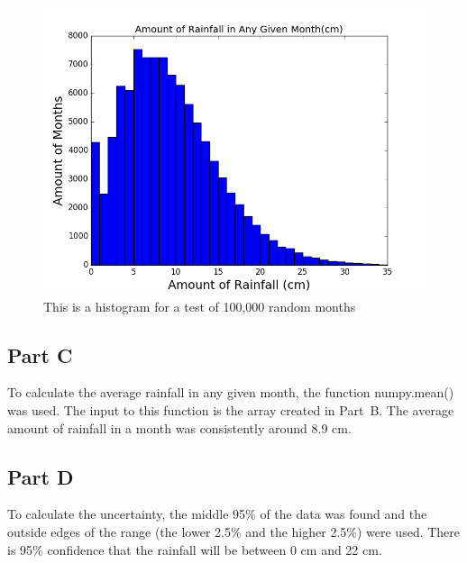 \documentclass[twocolumn]{revtex4}
\begin{document}
	\begin{figure}[h]
	
		\centering
		\includegraphics[width=.9\textwidth]{Rain_Histogram.png}
		\caption{This is a histogram for a test of 100,000 random months \label{histo}}
	
	\end{figure}

\subsection{Part C}

	To calculate the average rainfall in any given month, the function numpy.mean() was
	used. The input to this function is the array created in Part~B. The average amount of 
	rainfall in a month was consistently around 8.9 cm.

\subsection{Part D}

	To calculate the uncertainty, the middle 95\% of the data was found and the outside
	edges of the range (the lower 2.5\% and the higher 2.5\%) were used. There is 95\%
	confidence that the rainfall will be between 0 cm and 22 cm.
\end{document}
